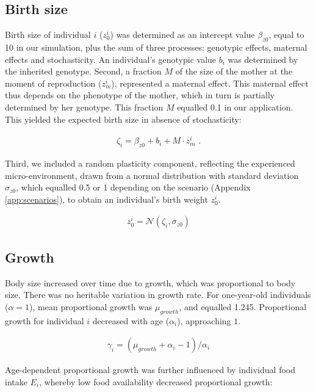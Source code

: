 \subsection{Birth size} \label{app:simul:birth}
Birth size of individual $i$ ($z^i_0$) was determined as an intercept value $\beta_{z0}$, equal to 10 in our simulation, plus the sum of three processes: genotypic effects, maternal effects and stochasticity.  An individual's genotypic value $b_i$ was determined by the inherited genotype. Second, a fraction $M$ of the size of the mother at the moment of reproduction ($z^i_m$), represented a maternal effect. This maternal effect thus depends on the phenotype of the mother, which in turn is partially determined by her genotype. This fraction $M$ equalled 0.1 in our application. This yielded the expected birth size in absence of stochasticity:

\begin{align}
\zeta_i = \beta_{z0} + b_i + M \cdot z^i_m \text{ .}
\end{align}

Third, we included a random plasticity component, reflecting the experienced micro-environment, drawn from a normal distribution with standard deviation $\sigma_{z0}$, which equalled 0.5 or 1 depending on the scenario (Appendix \ref{app:scenarios}), to obtain an individual's birth weight $z^i_0$.

\begin{align}
z^i_0 = \mathcal{N}(\zeta_i,\sigma_{z0})
\end{align}

\subsection{Growth} \label{app:simul:growth}
Body size increased over time due to growth, which was proportional to body size. There was no heritable variation in growth rate. For one-year-old individuals ($\alpha=1$), mean proportional growth was $\mu_{growth}$, and equalled 1.245. Proportional growth for individual $i$ decreased with age ($\alpha_i$), approaching $1$. 

\begin{align}
\label{eq:meanG}
\gamma_i = (\mu_{growth} +\alpha_i -1) / \alpha_i
\end{align}

Age-dependent proportional growth was further influenced by individual food intake $E_i$, whereby low food availability decreased proportional growth:

